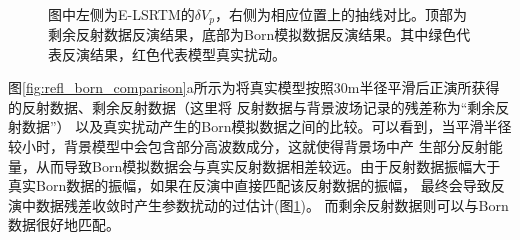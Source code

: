 \begin{figure}[!htb]
   \centering
   \\
   \caption{图中左侧为E-LSRTM的$\delta
	   V_p$，右侧为相应位置上的抽线对比。顶部为剩余反射数据反演结果，底部为Born模拟数据反演结果。其中绿色代表反演结果，红色代表模型真实扰动。}
   \label{fig:Vpcomparison}
\end{figure}

图\ref{fig:refl_born_comparison}a所示为将真实模型按照30m半径平滑后正演所获得的反射数据、剩余反射数据（这里将
反射数据与背景波场记录的残差称为“剩余反射数据”）
以及真实扰动产生的Born模拟数据之间的比较。可以看到，当平滑半径较小时，背景模型中会包含部分高波数成分，这就使得背景场中产
生部分反射能量，从而导致Born模拟数据会与真实反射数据相差较远。由于反射数据振幅大于真实Born数据的振幅，如果在反演中直接匹配该反射数据的振幅，
最终会导致反演中数据残差收敛时产生参数扰动的过估计(图\ref{fig:Vpcomparison})。
而剩余反射数据则可以与Born数据很好地匹配。

